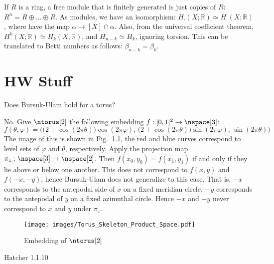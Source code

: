 \documentclass{book}                                                           %
\begin{document}
            If $R$ is a ring, a free module that is finitely generated
            is just copies of $R$: $R^{n}=R\oplus\dots\oplus{R}$. As
            modules, we have an isomorphism:
            $H_{\cdot}(X;\mathbb{R})\simeq{H}^{\cdot}(X;\mathbb{R})$,
            where have the map $\alpha\mapsto[X]\cap\alpha$. Also, from
            the universal coefficient theorem,
            $H^{k}(X;\mathbb{R})\simeq{H}_{k}(X;\mathbb{R})$, and
            $H_{n-k}\simeq{H}_{k}$, ignoring torsion. This can be
            translated to Betti numbers as follows:
            $\beta_{n-k}=\beta_{k}$.
\chapter{HW Stuff}
\begin{problem}
    Does Bursuk-Ulam hold for a torus?
\end{problem}
\begin{solution}
    No. Give $\ntorus[2]$ the following embedding
    $f:[0,1]^{2}\rightarrow\nspace[3]$:
    \begin{equation}
        f(\theta,\varphi)=\Big(
            \big(2+\cos(2\pi\theta)\big)\cos(2\pi\varphi),\,
            \big(2+\cos(2\pi\theta)\big)\sin(2\pi\varphi),\,
            \sin(2\pi\theta)
        \Big)
    \end{equation}
    The image of this is shown in Fig.~\ref{fig:Embedding_of_Torus}, the
    red and blue curves correspond to level sets of
    $\varphi$ and $\theta$, respectively. Apply the projection map
    $\pi_{z}:\nspace[3]\rightarrow\nspace[2]$. Then
    $f(x_{0},y_{0})=f(x_{1},y_{1})$ if and only if they lie above or below
    one another. This does not correspond to $f(x,y)$ and
    $f(\minus{x},\minus{y})$, hence Bursuk-Ulam does not generalize to this
    case. That is, $\minus{x}$ corresponds to the antepodal side of $x$ on
    a fixed meridian circle, $\minus{y}$ corresponds to the antepodal of
    $y$ on a fixed azimuthal circle. Hence $\minus{x}$ and $\minus{y}$
    never correspond to $x$ and $y$ under $\pi_{z}$.
\end{solution}
\begin{figure}[H]
    \centering
    \captionsetup{type=figure}
    \texttt{[image: images/Torus\_Skeleton\_Product\_Space.pdf]}
    \caption{Embedding of $\ntorus[2]$}
    \label{fig:Embedding_of_Torus}
\end{figure}
\begin{problem}
    Hatcher 1.1.10
\end{problem}
\end{document}
